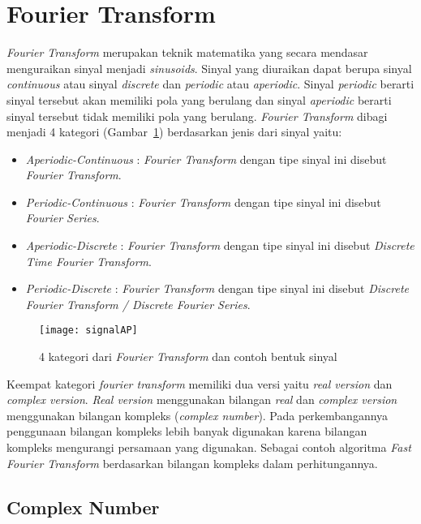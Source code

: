 \section{Fourier Transform \cite{steven:0:dsp}} 
\label{sec:fourier}
{\it Fourier Transform} merupakan teknik matematika yang secara mendasar menguraikan sinyal menjadi {\it sinusoids}. Sinyal yang diuraikan dapat berupa sinyal {\it continuous} atau sinyal {\it discrete} dan {\it periodic} atau {\it aperiodic}. Sinyal {\it periodic} berarti sinyal tersebut akan memiliki pola yang berulang dan sinyal {\it aperiodic} berarti sinyal tersebut tidak memiliki pola yang berulang. {\it Fourier Transform} dibagi menjadi 4 kategori (Gambar~\ref{fig:signalAP}) berdasarkan jenis dari sinyal yaitu:
\begin{itemize}
	\item {\it Aperiodic-Continuous} : {\it Fourier Transform} dengan tipe sinyal ini disebut {\it Fourier Transform}.
	\item {\it Periodic-Continuous} : {\it Fourier Transform} dengan tipe sinyal ini disebut {\it Fourier Series}.
	\item {\it Aperiodic-Discrete} : {\it Fourier Transform} dengan tipe sinyal ini disebut {\it Discrete Time Fourier Transform}.
	\item {\it Periodic-Discrete} : {\it Fourier Transform} dengan tipe sinyal ini disebut {\it Discrete Fourier Transform / Discrete Fourier Series}.
\end{itemize}  

\begin{figure} [H]
	\centering  
	\texttt{[image: signalAP]}  
	\caption[4 kategori dari {\it Fourier Transform} dan contoh bentuk sinyal]{4 kategori dari {\it Fourier Transform} dan contoh bentuk sinyal} 
	\label{fig:signalAP} 
\end{figure} 

Keempat kategori {\it fourier transform} memiliki dua versi yaitu {\it real version} dan {\it complex version}. {\it Real version} menggunakan bilangan {\it real} dan {\it complex version} menggunakan bilangan kompleks ({\it complex number}). Pada perkembangannya penggunaan bilangan kompleks lebih banyak digunakan karena bilangan kompleks mengurangi persamaan yang digunakan. Sebagai contoh algoritma {\it Fast Fourier Transform} berdasarkan bilangan kompleks dalam perhitungannya.   

\subsection{Complex Number \cite{steven:0:dsp}}
\label{subsec:complex}

